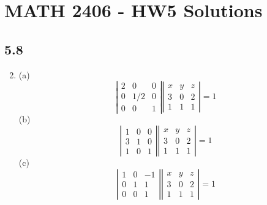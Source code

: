 \documentclass[a4paper, 12pt]{article}
\begin{document}
	\section*{MATH 2406 - HW5 Solutions}
	
	\subsection*{5.8}
	\begin{enumerate}
		\setcounter{enumi}{1}
		\item (a)
		\[ \left| \begin{array}{ccc}
			2 & 0 & 0 \\
			0 & 1/2 & 0 \\
			0 & 0 & 1
		\end{array} \right|
		\left| \begin{array}{ccc}
			x & y & z \\
			3 & 0 & 2 \\
			1 & 1 & 1
		\end{array} \right|
		= 1 \]
		(b)
		\[ \left| \begin{array}{ccc}
		1 & 0 & 0 \\
		3 & 1 & 0 \\
		1 & 0 & 1
		\end{array} \right|
		\left| \begin{array}{ccc}
		x & y & z \\
		3 & 0 & 2 \\
		1 & 1 & 1
		\end{array} \right|
		= 1 \]
		(c)
		\[ \left| \begin{array}{ccc}
		1 & 0 & -1 \\
		0 & 1 & 1 \\
		0 & 0 & 1
		\end{array} \right|
		\left| \begin{array}{ccc}
		x & y & z \\
		3 & 0 & 2 \\
		1 & 1 & 1
		\end{array} \right|
		= 1 \]


\end{enumerate}
\end{document}
